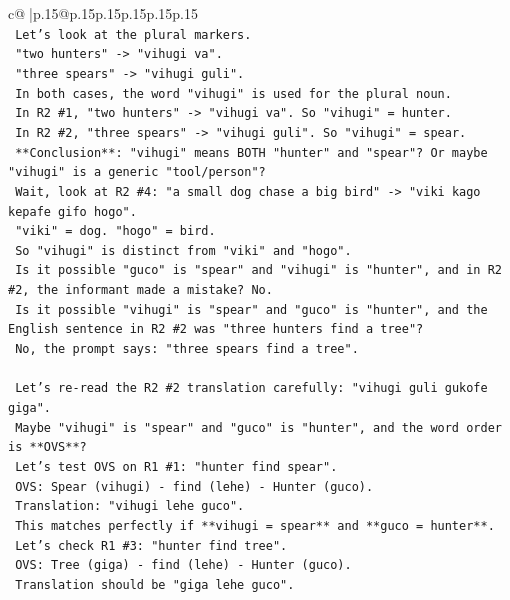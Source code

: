 \documentclass{article}
\begin{document}
{\begin{supertabular}{c@{$\;$}|p{.15\linewidth}@{}p{.15\linewidth}p{.15\linewidth}p{.15\linewidth}p{.15\linewidth}p{.15\linewidth}}
{{{\\ 
\texttt{   Let's look at the plural markers.} \\
\texttt{   "two hunters" {-}> "vihugi va".} \\
\texttt{   "three spears" {-}> "vihugi guli".} \\
\texttt{   In both cases, the word "vihugi" is used for the plural noun.} \\
\texttt{   In R2 \#1, "two hunters" {-}> "vihugi va". So "vihugi" = hunter.} \\
\texttt{   In R2 \#2, "three spears" {-}> "vihugi guli". So "vihugi" = spear.} \\
\texttt{   **Conclusion**: "vihugi" means BOTH "hunter" and "spear"? Or maybe "vihugi" is a generic "tool/person"?} \\
\texttt{   Wait, look at R2 \#4: "a small dog chase a big bird" {-}> "viki kago kepafe gifo hogo".} \\
\texttt{   "viki" = dog. "hogo" = bird.} \\
\texttt{   So "vihugi" is distinct from "viki" and "hogo".} \\
\texttt{   Is it possible "guco" is "spear" and "vihugi" is "hunter", and in R2 \#2, the informant made a mistake? No.} \\
\texttt{   Is it possible "vihugi" is "spear" and "guco" is "hunter", and the English sentence in R2 \#2 was "three hunters find a tree"?} \\
\texttt{   No, the prompt says: "three spears find a tree".} \\
\\ 
\texttt{   Let's re{-}read the R2 \#2 translation carefully: "vihugi guli gukofe giga".} \\
\texttt{   Maybe "vihugi" is "spear" and "guco" is "hunter", and the word order is **OVS**?} \\
\texttt{   Let's test OVS on R1 \#1: "hunter find spear".} \\
\texttt{   OVS: Spear (vihugi) {-} find (lehe) {-} Hunter (guco).} \\
\texttt{   Translation: "vihugi lehe guco".} \\
\texttt{   This matches perfectly if **vihugi = spear** and **guco = hunter**.} \\
\texttt{   Let's check R1 \#3: "hunter find tree".} \\
\texttt{   OVS: Tree (giga) {-} find (lehe) {-} Hunter (guco).} \\
\texttt{   Translation should be "giga lehe guco".} \\
}}}
\end{supertabular}}
\end{document}
